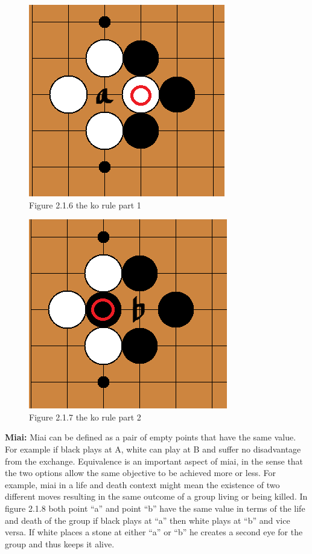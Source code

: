 \documentclass{l3proj}
\begin{document}
\begin{figure}[H]
\centering
\includegraphics[scale=0.5]{Images/korule2.png}
\caption{Figure 2.1.6 the ko rule part 1}
\end{figure}

\begin{figure}[H]
\centering
\includegraphics[scale=0.5]{Images/korule1.png}
\caption{Figure 2.1.7 the ko rule part 2}
\end{figure}

\textbf{Miai:} Miai can be defined as a pair of empty points that have the same value. For example if black plays at A, white can play at B and suffer no disadvantage from the exchange. Equivalence is an important aspect of miai, in the sense that the two options allow the same objective to be achieved more or less. For example, miai in a life and death context might mean the existence of two different moves resulting in the same outcome of a group living or being killed. In figure 2.1.8 both point “a” and point “b” have the same value in terms of the life and death of the group if black plays at “a” then white plays at “b” and vice versa. If white places a stone at either “a” or “b” he creates a second eye for the group and thus keeps it alive.
\end{document}
